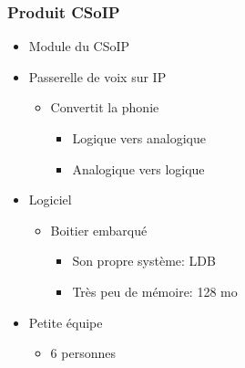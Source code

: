 \begin{frame}
    \frametitle{Produit CSoIP}
    \begin{itemize}
        \item Module du CSoIP
        \item Passerelle de voix sur IP
            \begin{itemize}
                \item Convertit la phonie
                    \begin{itemize}
                        \item Logique vers analogique
                        \item Analogique vers logique
                    \end{itemize}
            \end{itemize}
        \item Logiciel
        \begin{itemize}
            \item Boitier embarqué
                \begin{itemize}
                    \item Son propre système: LDB
                    \item Très peu de mémoire: 128 mo
                \end{itemize}
        \end{itemize}
        \item Petite équipe
            \begin{itemize}
                \item 6 personnes
            \end{itemize}
    \end{itemize}
\end{frame}
